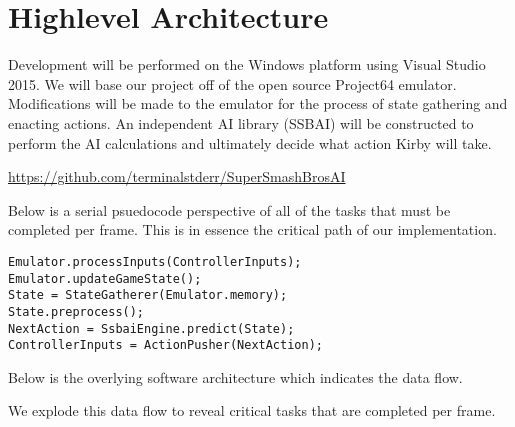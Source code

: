 \chapter*{Highlevel Architecture}

Development will be performed on the Windows platform using Visual Studio 2015.
We will base our project off of the open source Project64 emulator.
Modifications will be made to the emulator for the process of state gathering and enacting actions.
An independent AI library (SSBAI) will be constructed to perform the AI calculations and ultimately decide what action Kirby will take.

\url{https://github.com/terminalstderr/SuperSmashBrosAI}

Below is a serial psuedocode perspective of all of the tasks that must be completed per frame.
This is in essence the critical path of our implementation.
\begin{verbatim}
Emulator.processInputs(ControllerInputs);
Emulator.updateGameState();
State = StateGatherer(Emulator.memory);
State.preprocess();
NextAction = SsbaiEngine.predict(State);
ControllerInputs = ActionPusher(NextAction);
\end{verbatim}

Below is the overlying software architecture which indicates the data flow.


We explode this data flow to reveal critical tasks that are completed per frame.



